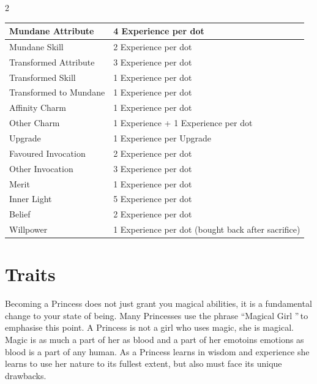 \begin{multicols}{2}
\label{sec:CharacterAdvancement}

    \centering
    \begin{tabular}{|l|l|}
        \hline
        Mundane Attribute       & 4 Experience per dot                                \\ \hline
        Mundane Skill           & 2 Experience per dot                                \\ \hline
        Transformed Attribute   & 3 Experience per dot                                \\ \hline
        Transformed Skill       & 1 Experience per dot                                \\ \hline
        Transformed to Mundane  & 1 Experience per dot  \\ \hline
        Affinity Charm          & 1 Experience per dot                                            \\ \hline
        Other Charm             & 1 Experience + 1 Experience per dot                                           \\ \hline
        Upgrade          	 & 1 Experience per Upgrade                                                   \\ \hline
        Favoured Invocation     & 2 Experience per dot                                        \\ \hline
        Other Invocation        & 3 Experience per dot                                        \\ \hline
        Merit                   & 1 Experience per dot                                        \\ \hline
        Inner Light             & 5 Experience per dot                                       \\ \hline
        Belief                  & 2 Experience per dot                                    \\ \hline
        Willpower               & 1 Experience per dot (bought back after sacrifice)                     \\
        \hline
    \end{tabular}	
    
    \bigsidebarend

\section*{Traits} 
\label{sec:Traits}

Becoming a Princess does not just grant you magical abilities, it is a fundamental change to your state of being. Many Princesses use the phrase \textquotedblleft Magical Girl \textquotedblright\,to emphasise this point. A Princess is not a girl who uses magic, she is magical. Magic is as much a part of her as blood and a part of her emotoins emotions as blood is a part of any human. As a Princess learns in wisdom and experience she learns to use her nature to its fullest extent, but also must face its unique drawbacks. 


\end{multicols}
